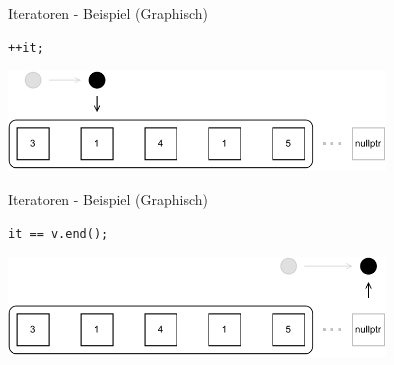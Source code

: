 \begin{frame}[fragile]{Iteratoren - Beispiel (Graphisch)}
    \begin{verbatim}
++it;
    \end{verbatim}

    \begin{center}
        \includegraphics[width=0.75\textwidth]{pictures/iterators_example_3.pdf}
    \end{center}
\end{frame}

\begin{frame}[fragile]{Iteratoren - Beispiel (Graphisch)}
    \begin{verbatim}
it == v.end();
    \end{verbatim}

    \begin{center}
        \includegraphics[width=0.75\textwidth]{pictures/iterators_example_4.pdf}
    \end{center}
\end{frame}